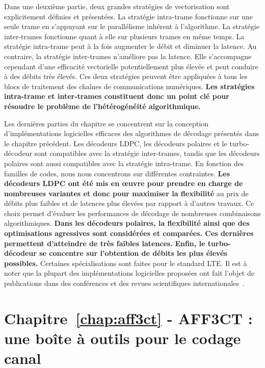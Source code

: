 Dans une deuxième partie, deux grandes stratégies de vectorisation sont
explicitement définies et présentées. La stratégie intra-trame fonctionne
sur une seule trame en s'appuyant sur le parallélisme inhérent à l'algorithme.
La stratégie inter-trames fonctionne quant à elle sur plusieurs trames en même
temps. La stratégie intra-trame peut à la fois augmenter le débit et diminuer la
latence. Au contraire, la stratégie inter-trames n'améliore pas la latence. Elle
s'accompagne cependant d'une efficacité vectorielle potentiellement plus élevée
et peut conduire à des débits très élevés. Ces deux stratégies peuvent être
appliquées à tous les blocs de traitement des chaînes de communications
numériques. \textbf{Les stratégies intra-trame et inter-trames constituent donc
un point clé pour résoudre le problème de l'hétérogénéité algorithmique.}

Les dernières parties du chapitre se concentrent sur la conception
d'implémentations logicielles efficaces des algorithmes de décodage présentés
dans le chapitre précédent. Les décodeurs LDPC, les décodeurs polaires et le
turbo-décodeur sont compatibles avec la stratégie inter-trames, tandis que les
décodeurs polaires sont aussi compatibles avec la stratégie intra-trame. En
fonction des familles de codes, nous nous concentrons sur différentes
contraintes. \textbf{Les décodeurs LDPC ont été mis en œuvre pour prendre en
charge de nombreuses variantes et donc pour maximiser la flexibilité} au prix de
débits plus faibles et de latences plus élevées par rapport à d'autres travaux.
Ce choix permet d'évaluer les performances de décodage de nombreuses
combinaisons algorithmiques. \textbf{Dans les décodeurs polaires, la flexibilité
ainsi que des optimisations agressives sont considérées et comparées. Ces
dernières permettent d'atteindre de très faibles latences.} \textbf{Enfin, le
turbo-décodeur se concentre sur l'obtention de débits les plus élevés
possibles.} Certaines spécialisations sont faites pour le standard LTE. Il est à
noter que la plupart des implémentations logicielles proposées ont fait l'objet
de publications dans des conférences et des revues scientifiques
internationales~\cite{Ghaffari2019,Leonardon2019,Cassagne2015c,Cassagne2016b,
Cassagne2016a}.

\section*{Chapitre~\ref{chap:aff3ct} - AFF3CT : une boîte à outils pour le codage canal}

